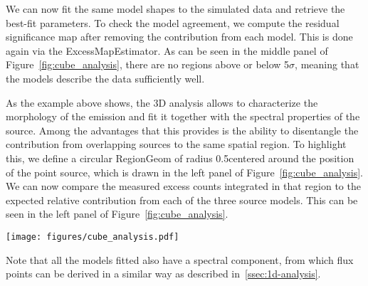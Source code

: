 We can now fit the same model shapes to the simulated data and retrieve the best-fit parameters. To check the model agreement, we compute the residual significance map after removing the contribution from each model. This is done again via the ExcessMapEstimator. As can be seen in the middle panel of Figure~\ref{fig:cube_analysis}, there are no regions above or below 5$\sigma$, meaning that the models describe the data sufficiently well.

As the example above shows, the 3D analysis allows to characterize the morphology of the emission and fit it together with the spectral properties of the source.  Among the advantages that this provides is the ability to disentangle the contribution from overlapping sources to the same spatial region. To highlight this, we define a circular RegionGeom of radius 0.5\textdegree centered around the position of the point source, which is drawn in the left panel of Figure~\ref{fig:cube_analysis}. We can now compare the measured excess counts integrated in that region to the expected relative contribution from each of the three source models. This can be seen in the left panel of Figure~\ref{fig:cube_analysis}.

\begin{figure*}[t]
	\centering
	\texttt{[image: figures/cube\_analysis.pdf]}
	\caption{Example 3D analysis for simulated sources using the \cta \irfs. The left image shows a significance map where the three simulated sources can be seen. The middle figure shows another significance map, but this time after subtracting the best-fit model for each of the sources, which are displayed in black. The right figure shows the contribution of each source model to the circular region of radius 0.5\textdegree drawn in the left image, together with the excess counts inside that region.
	}
	\label{fig:cube_analysis}
\end{figure*}

Note that all the models fitted also have a spectral component, from which flux points can be derived in a similar way as described in~\ref{ssec:1d-analysis}.
%
